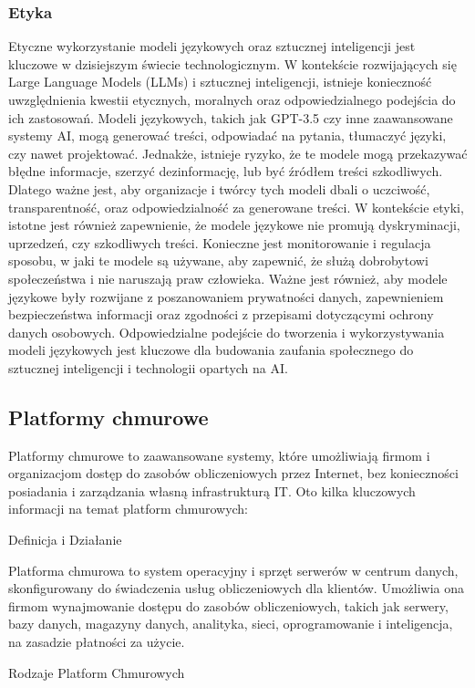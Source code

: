 \subsubsection{Etyka}
Etyczne wykorzystanie modeli językowych oraz sztucznej inteligencji jest kluczowe w dzisiejszym świecie technologicznym. W kontekście rozwijających się Large Language Models (LLMs) i sztucznej inteligencji, istnieje konieczność uwzględnienia kwestii etycznych, moralnych oraz odpowiedzialnego podejścia do ich zastosowań. Modeli językowych, takich jak GPT-3.5 czy inne zaawansowane systemy AI, mogą generować treści, odpowiadać na pytania, tłumaczyć języki, czy nawet projektować. Jednakże, istnieje ryzyko, że te modele mogą przekazywać błędne informacje, szerzyć dezinformację, lub być źródłem treści szkodliwych. Dlatego ważne jest, aby organizacje i twórcy tych modeli dbali o uczciwość, transparentność, oraz odpowiedzialność za generowane treści. W kontekście etyki, istotne jest również zapewnienie, że modele językowe nie promują dyskryminacji, uprzedzeń, czy szkodliwych treści. Konieczne jest monitorowanie i regulacja sposobu, w jaki te modele są używane, aby zapewnić, że służą dobrobytowi społeczeństwa i nie naruszają praw człowieka. Ważne jest również, aby modele językowe były rozwijane z poszanowaniem prywatności danych, zapewnieniem bezpieczeństwa informacji oraz zgodności z przepisami dotyczącymi ochrony danych osobowych. Odpowiedzialne podejście do tworzenia i wykorzystywania modeli językowych jest kluczowe dla budowania zaufania społecznego do sztucznej inteligencji i technologii opartych na AI.
\clearpage

\subsection{Platformy chmurowe}
Platformy chmurowe to zaawansowane systemy, które umożliwiają firmom i organizacjom dostęp do zasobów obliczeniowych przez Internet, bez konieczności posiadania i zarządzania własną infrastrukturą IT. Oto kilka kluczowych informacji na temat platform chmurowych:

Definicja i Działanie

Platforma chmurowa to system operacyjny i sprzęt serwerów w centrum danych, skonfigurowany do świadczenia usług obliczeniowych dla klientów. Umożliwia ona firmom wynajmowanie dostępu do zasobów obliczeniowych, takich jak serwery, bazy danych, magazyny danych, analityka, sieci, oprogramowanie i inteligencja, na zasadzie płatności za użycie.

Rodzaje Platform Chmurowych


